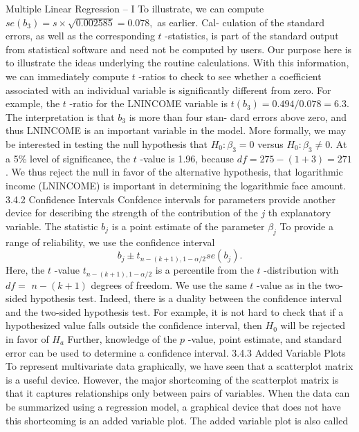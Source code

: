 \documentclass[11pt]{article}
\begin{document}
 Multiple Linear Regression -- I
To illustrate, we can compute \(s e ( b_{3} )=s \times\sqrt{0 . 0 0 2 5 8 5}=0 . 0 7 8 ,\) as earlier. Cal-
culation of the standard errors, as well as the corresponding \(t\) -statistics, is part of
 the standard output from statistical software and need not be computed by users.
 Our purpose here is to illustrate the ideas underlying the routine calculations.
With this information, we can immediately compute \(t\) -ratios to check to
see whether a coefficient associated with an individual variable is significantly
different from zero. For example, the \(t\) -ratio for the LNINCOME variable is
\(t ( b_{3} )=0 . 4 9 4 / 0 . 0 7 8=6 . 3 .\) The interpretation is that \(b_{3}\) is more than four stan-
dard errors above zero, and thus LNINCOME is an important variable in the
model. More formally, we may be interested in testing the null hypothesis that
\(H_{0} : \beta_{3}=0\) versus \(H_{0} : \beta_{3} \neq0 .\) At a 5\% level of significance, the \(t\) -value is
1.96, because \(d f=2 7 5-\left( 1+3 \right)=2 7 1\) . We thus reject the null in favor of the
alternative hypothesis, that logarithmic income (LNINCOME) is important in
 determining the logarithmic face amount.
3.4.2 Confidence Intervals
Confdence intervals for parameters provide another device for describing the
strength of the contribution of the \(j\) th explanatory variable. The statistic \(b_{j}\) is a
 point estimate of the parameter \(\beta_{j}\) To provide a range of reliability, we use the
confidence interval
\[
b_{j} \pm t_{n-( k+1 ) , 1-\alpha/ 2} s e ( b_{j} ) . \tag{3.10}
\]
Here, the \(t\) -value \(t_{n-( k+1 ) , 1-\alpha/ 2}\) is a percentile from the \(t\) -distribution with \(d f=\)
\(n-( k+1 )\) degrees of freedom. We use the same \(t\) -value as in the two-sided
hypothesis test. Indeed, there is a duality between the confidence interval and
the two-sided hypothesis test. For example, it is not hard to check that if a
 hypothesized value falls outside the confidence interval, then \(H_{0}\) will be rejected
 in favor of \(H_{a}\) Further, knowledge of the \(p\) -value, point estimate, and standard
error can be used to determine a confidence interval.
 3.4.3 Added Variable Plots
To represent multivariate data graphically, we have seen that a scatterplot matrix
is a useful device. However, the major shortcoming of the scatterplot matrix is
 that it captures relationships only between pairs of variables. When the data can
be summarized using a regression model, a graphical device that does not have
 this shortcoming is an added variable plot. The added variable plot is also called
\end{document}
